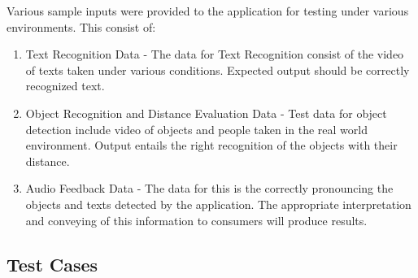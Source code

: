 \documentclass[MScCS]{uccthesis}
\begin{document}
 Various sample inputs were provided to the application for testing under various environments. This consist of:
 \begin{enumerate}
     \item Text Recognition Data - The data for Text Recognition consist of the video of texts taken under various conditions. Expected output should be correctly recognized text.
     \item Object Recognition and Distance Evaluation Data - Test data for object detection include video of objects and people  taken in the real world environment. Output entails the right recognition of the objects with their distance.
     \item Audio Feedback Data - The data for this is the correctly pronouncing the objects and texts detected by the application. The appropriate interpretation and conveying of this information to consumers will produce results.
 \end{enumerate}
\newpage
\subsection{Test Cases}
\end{document}
